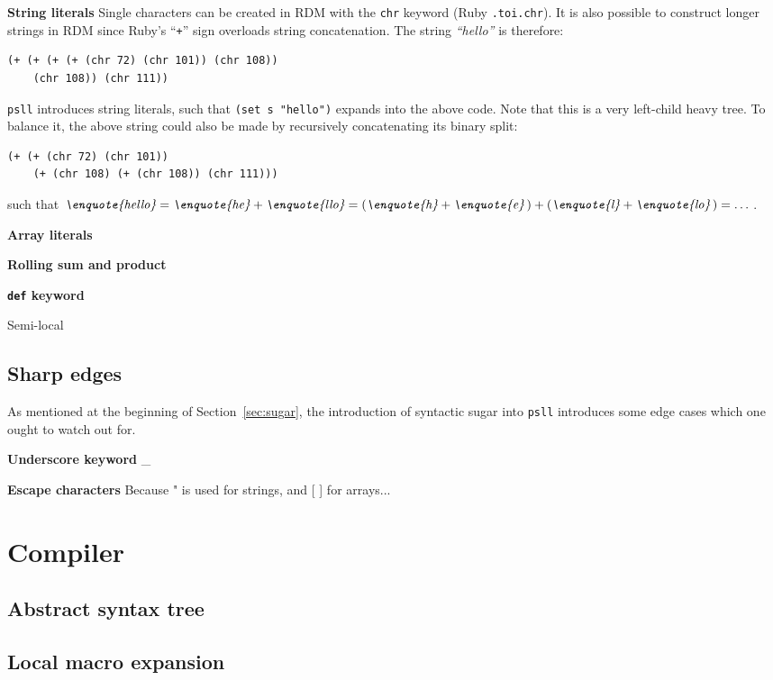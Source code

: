 \documentclass[aip,jcp,reprint,footinbib]{revtex4-1}
\let\tt\texttt
\newcommand\psll{\texttt{psll}\xspace}
\newcommand{\ilpsll}[1]{\lstinline[language=psll,columns=flexible]{#1}}
\begin{document}
\textbf{String literals} Single characters can be created in RDM with the \tt{chr} keyword (Ruby \tt{.to\textunderscore{}i.chr}). It is also possible to construct longer strings in RDM since Ruby's \enquote{\tt{+}} sign overloads string concatenation. The string \textit{\enquote{hello}} is therefore:
\begin{lstlisting}[language=psll,aboveskip=3pt,belowskip=-2pt]
(+ (+ (+ (+ (chr 72) (chr 101)) (chr 108))
	(chr 108)) (chr 111))
\end{lstlisting}
\psll introduces string literals, such that \ilpsll{(set s "hello")} expands into the above code. Note that this is a very left-child heavy tree. To balance it, the above string could also be made by recursively concatenating its binary split:
\begin{lstlisting}[language=psll,aboveskip=3pt,belowskip=-2pt]
(+ (+ (chr 72) (chr 101))
	(+ (chr 108) (+ (chr 108)) (chr 111)))
\end{lstlisting}
such that $\textit{\enquote{hello}} = \textit{\enquote{he}} + \textit{\enquote{llo}} = \left(\textit{\enquote{h}} + \textit{\enquote{e}}\,\right) + \left(\textit{\enquote{l}} + \textit{\enquote{lo}}\,\right) = \dots$.

\textbf{Array literals}

\textbf{Rolling sum and product}

\textbf{\tt{def} keyword}

Semi-local

\subsection{Sharp edges}\label{sec:sharp_edges}
As mentioned at the beginning of Section~\ref{sec:sugar}, the introduction of syntactic sugar into \psll introduces some edge cases which one ought to watch out for.

\textbf{Underscore keyword}
\_

\textbf{Escape characters}
Because " is used for strings, and [ ] for arrays...

\section{Compiler}
\subsection{Abstract syntax tree}
\subsection{Local macro expansion}\label{sec:macros}
\end{document}
